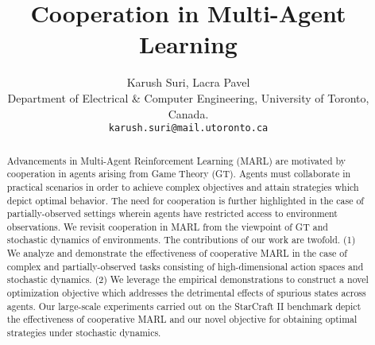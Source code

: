 \documentclass{article}
\title{Cooperation in Multi-Agent Learning}
\author{
  Karush Suri, Lacra Pavel\\
   Department of Electrical \& Computer Engineering, University of Toronto, Canada.\\
  \texttt{karush.suri@mail.utoronto.ca}
}
\begin{document}
\maketitle

\begin{abstract}
Advancements in Multi-Agent Reinforcement Learning (MARL) are motivated by cooperation in agents arising from Game Theory (GT). Agents must collaborate in practical scenarios in order to achieve complex objectives and attain strategies which depict optimal behavior. The need for cooperation is further highlighted in the case of partially-observed settings wherein agents have restricted access to environment observations. We revisit cooperation in MARL from the viewpoint of GT and stochastic dynamics of environments. The contributions of our work are twofold. (1) We analyze and demonstrate the effectiveness of cooperative MARL in the case of complex and partially-observed tasks consisting of high-dimensional action spaces and stochastic dynamics. (2) We leverage the empirical demonstrations to construct a novel optimization objective which addresses the detrimental effects of spurious states across agents. Our large-scale experiments carried out on the StarCraft II benchmark depict the effectiveness of cooperative MARL and our novel objective for obtaining optimal strategies under stochastic dynamics. 

\end{abstract}
\end{document}
